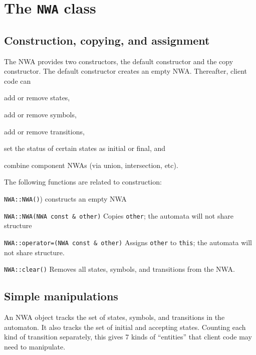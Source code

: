 \section{The \texttt{NWA} class}
\label{Se:NWA-class}

\subsection{Construction, copying, and assignment}
\label{Se:Construction}

The NWA provides two constructors, the default constructor and the copy
constructor. The default constructor creates an empty NWA. Thereafter, 
client code can \begin{inparaenum} \item add or remove states, \item add or remove
symbols, \item add or remove transitions, \item set the status of certain
  states as initial or final, and \item combine component NWAs (via union,
  intersection, etc). \end{inparaenum}


The following functions are related to construction:
\begin{description}
  \item \texttt{NWA::NWA()}) constructs an empty NWA

  \item \texttt{NWA::NWA(NWA const \& other)} Copies \texttt{other}; the
    automata will not share structure

  \item \texttt{NWA::operator=(NWA const \& other)} Assigns \texttt{other} to \texttt{this};
    the automata will not share structure.

  \item \texttt{NWA::clear()} \nopagebreak
    Removes all states, symbols, and transitions from the NWA.

\end{description}


\subsection{Simple manipulations}

An NWA object tracks the set of states, symbols, and transitions in the
automaton. It also tracks the set of initial and accepting states.
Counting each kind of transition separately, this gives 7 kinds of
``entities'' that client code may need to manipulate.

